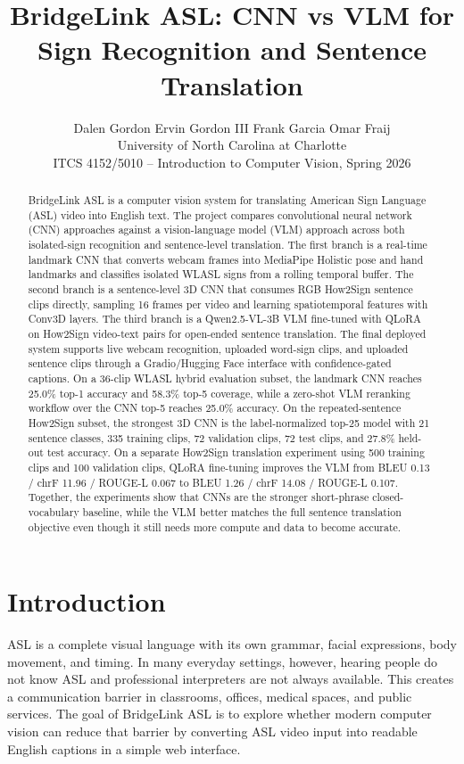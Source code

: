 \documentclass[10pt,twocolumn,letterpaper]{article}
\title{\vspace{-1.0em}\textbf{BridgeLink ASL: CNN vs VLM for Sign Recognition and Sentence Translation}}
\author{
Dalen Gordon \quad Ervin Gordon III \quad Frank Garcia \quad Omar Fraij\\
University of North Carolina at Charlotte\\
ITCS 4152/5010 -- Introduction to Computer Vision, Spring 2026
}
\date{}
\begin{document}
\maketitle

\begin{abstract}
BridgeLink ASL is a computer vision system for translating American Sign Language (ASL) video into English text. The project compares convolutional neural network (CNN) approaches against a vision-language model (VLM) approach across both isolated-sign recognition and sentence-level translation. The first branch is a real-time landmark CNN that converts webcam frames into MediaPipe Holistic pose and hand landmarks and classifies isolated WLASL signs from a rolling temporal buffer. The second branch is a sentence-level 3D CNN that consumes RGB How2Sign sentence clips directly, sampling 16 frames per video and learning spatiotemporal features with Conv3D layers. The third branch is a Qwen2.5-VL-3B VLM fine-tuned with QLoRA on How2Sign video-text pairs for open-ended sentence translation. The final deployed system supports live webcam recognition, uploaded word-sign clips, and uploaded sentence clips through a Gradio/Hugging Face interface with confidence-gated captions. On a 36-clip WLASL hybrid evaluation subset, the landmark CNN reaches 25.0\% top-1 accuracy and 58.3\% top-5 coverage, while a zero-shot VLM reranking workflow over the CNN top-5 reaches 25.0\% accuracy. On the repeated-sentence How2Sign subset, the strongest 3D CNN is the label-normalized top-25 model with 21 sentence classes, 335 training clips, 72 validation clips, 72 test clips, and 27.8\% held-out test accuracy. On a separate How2Sign translation experiment using 500 training clips and 100 validation clips, QLoRA fine-tuning improves the VLM from BLEU 0.13 / chrF 11.96 / ROUGE-L 0.067 to BLEU 1.26 / chrF 14.08 / ROUGE-L 0.107. Together, the experiments show that CNNs are the stronger short-phrase closed-vocabulary baseline, while the VLM better matches the full sentence translation objective even though it still needs more compute and data to become accurate.
\end{abstract}

\section{Introduction}

ASL is a complete visual language with its own grammar, facial expressions, body movement, and timing. In many everyday settings, however, hearing people do not know ASL and professional interpreters are not always available. This creates a communication barrier in classrooms, offices, medical spaces, and public services. The goal of BridgeLink ASL is to explore whether modern computer vision can reduce that barrier by converting ASL video input into readable English captions in a simple web interface.
\end{document}
